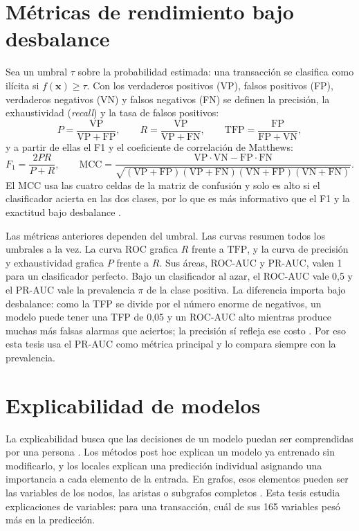 \section{Métricas de rendimiento bajo desbalance}\label{sec:metricas}

Sea un umbral $\tau$ sobre la probabilidad estimada: una transacción se clasifica como ilícita
si $f(\mathbf{x}) \geq \tau$. Con los verdaderos positivos (VP), falsos positivos (FP),
verdaderos negativos (VN) y falsos negativos (FN) se definen la precisión, la exhaustividad
(\textit{recall}) y la tasa de falsos positivos:
\begin{equation}
  P = \frac{\mathrm{VP}}{\mathrm{VP} + \mathrm{FP}}, \qquad
  R = \frac{\mathrm{VP}}{\mathrm{VP} + \mathrm{FN}}, \qquad
  \mathrm{TFP} = \frac{\mathrm{FP}}{\mathrm{FP} + \mathrm{VN}},
\end{equation}
y a partir de ellas el F1 y el coeficiente de correlación de Matthews:
\begin{equation}
  F_1 = \frac{2PR}{P + R}, \qquad
  \mathrm{MCC} = \frac{\mathrm{VP}\cdot\mathrm{VN} - \mathrm{FP}\cdot\mathrm{FN}}
  {\sqrt{(\mathrm{VP}+\mathrm{FP})(\mathrm{VP}+\mathrm{FN})(\mathrm{VN}+\mathrm{FP})(\mathrm{VN}+\mathrm{FN})}}.
\end{equation}
El MCC usa las cuatro celdas de la matriz de confusión y solo es alto si el clasificador acierta
en las dos clases, por lo que es más informativo que el F1 y la exactitud bajo desbalance
\cite{Chicco2020MCC}.

Las métricas anteriores dependen del umbral. Las curvas resumen todos los umbrales a la vez. La
curva ROC grafica $R$ frente a $\mathrm{TFP}$, y la curva de precisión y exhaustividad grafica
$P$ frente a $R$. Sus áreas, ROC-AUC y PR-AUC, valen 1 para un clasificador perfecto. Bajo un
clasificador al azar, el ROC-AUC vale 0,5 y el PR-AUC vale la prevalencia $\pi$ de la clase
positiva. La diferencia importa bajo desbalance: como la TFP se divide por el número enorme de
negativos, un modelo puede tener una TFP de 0,05 y un ROC-AUC alto mientras produce muchas más
falsas alarmas que aciertos; la precisión sí refleja ese costo \cite{Saito2015PR}. Por eso esta
tesis usa el PR-AUC como métrica principal y lo compara siempre con la prevalencia.

\section{Explicabilidad de modelos}\label{sec:xai}

La explicabilidad busca que las decisiones de un modelo puedan ser comprendidas por una persona
\cite{Adadi2018Peeking, Guidotti2018Survey, Arrieta2020XAI}. Los métodos post hoc explican un
modelo ya entrenado sin modificarlo, y los locales explican una predicción individual
asignando una importancia a cada elemento de la entrada. En grafos, esos elementos pueden ser las variables de los nodos, las aristas o subgrafos completos \cite{Yuan2023Taxonomic}. Esta tesis estudia explicaciones de variables: para una transacción, cuál
de sus 165 variables pesó más en la predicción.

